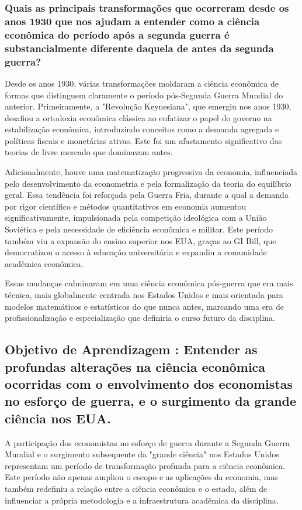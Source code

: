 \documentclass[a4paper,12pt]{article}[abntex2]
\begin{document}
\subsubsection{\textbf{Quais as principais transformações que ocorreram desde os anos 1930 que nos ajudam a entender como a ciência econômica do período após a segunda guerra é substancialmente diferente daquela de antes da segunda guerra?}}
Desde os anos 1930, várias transformações moldaram a ciência econômica de formas que distinguem claramente o período pós-Segunda Guerra Mundial do anterior. Primeiramente, a "Revolução Keynesiana", que emergiu nos anos 1930, desafiou a ortodoxia econômica clássica ao enfatizar o papel do governo na estabilização econômica, introduzindo conceitos como a demanda agregada e políticas fiscais e monetárias ativas. Este foi um afastamento significativo das teorias de livre mercado que dominavam antes.

Adicionalmente, houve uma matematização progressiva da economia, influenciada pelo desenvolvimento da econometria e pela formalização da teoria do equilíbrio geral. Essa tendência foi reforçada pela Guerra Fria, durante a qual a demanda por rigor científico e métodos quantitativos em economia aumentou significativamente, impulsionada pela competição ideológica com a União Soviética e pela necessidade de eficiência econômica e militar. Este período também viu a expansão do ensino superior nos EUA, graças ao GI Bill, que democratizou o acesso à educação universitária e expandiu a comunidade acadêmica econômica.

Essas mudanças culminaram em uma ciência econômica pós-guerra que era mais técnica, mais globalmente centrada nos Estados Unidos e mais orientada para modelos matemáticos e estatísticos do que nunca antes, marcando uma era de profissionalização e especialização que definiria o curso futuro da disciplina.


\subsection{\textbf{Objetivo de Aprendizagem : Entender as profundas alterações na ciência econômica ocorridas com o envolvimento dos economistas no esforço de guerra, e o surgimento da grande ciência nos EUA. }}
A participação dos economistas no esforço de guerra durante a Segunda Guerra Mundial e o surgimento subsequente da "grande ciência" nos Estados Unidos representam um período de transformação profunda para a ciência econômica. Este período não apenas ampliou o escopo e as aplicações da economia, mas também redefiniu a relação entre a ciência econômica e o estado, além de influenciar a própria metodologia e a infraestrutura acadêmica da disciplina.
\end{document}
